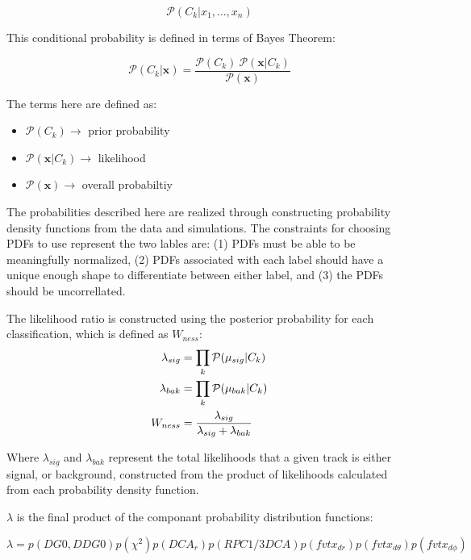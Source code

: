 \begin{equation}
	\label{eq:cond_probabilty}
  \mathcal{P}(C_k \vert x_1, \dots, x_n)
\end{equation}

{\noindent}This conditional probability is defined in terms of Bayes Theorem:

\begin{equation}
	\label{eq:bayes_theorm}
  \mathcal{P}(C_k \vert \mathbf{x}) = \frac{\mathcal{P}(C_k) \
  \mathcal{P}(\mathbf{x} \vert C_k)}{\mathcal{P}(\mathbf{x})}
\end{equation}

{\noindent}The terms here are defined as:
\begin{itemize}
  \item $\mathcal{P}(C_k)\rightarrow$ prior probability
	\item $\mathcal{P}(\mathbf{x} \vert C_k)\rightarrow$ likelihood
	\item $\mathcal{P}(\mathbf{x})\rightarrow$ overall probabiltiy
\end{itemize}

The probabilities described here are realized through constructing probability
density functions from the data and simulations. The constraints for choosing
PDFs to use represent the two lables are: (1) PDFs must be able to be
meaningfully normalized, (2) PDFs associated with each label should have a
unique enough shape to differentiate between either label, and (3) the PDFs
should be uncorrellated.
 

The likelihood ratio is constructed using the posterior probability
for each classification, which is defined as $W_{ness}$:
\begin{align}
  \lambda_{sig} &= \prod_{k}\mathcal{P}(\mu_{sig}\vert C_k)\\
  \lambda_{bak} &= \prod_{k}\mathcal{P}(\mu_{bak}\vert C_k)\\
  W_{ness} &= { 
    {\lambda_{sig}}
    \over 
    {\lambda_{sig}+\lambda_{bak}}\label{eq:wness_calculation}
  }
\end{align}

{\noindent}Where $\lambda_{sig}$ and $\lambda_{bak}$ represent the total
likelihoods that a given track is either signal, or background, constructed from
the product of likelihoods calculated from each probability density function.

{\noindent}$\lambda$ is the final product of the componant probability
distribution functions:

\begin{equation}
	\lambda =
	p(DG0,DDG0)p(\chi^2)p(DCA_r)p(RPC1/3DCA)p(fvtx_{dr})p(fvtx_{d\theta})p(fvtx_{d\phi})
	\label{eq:full_lambda}
\end{equation}

